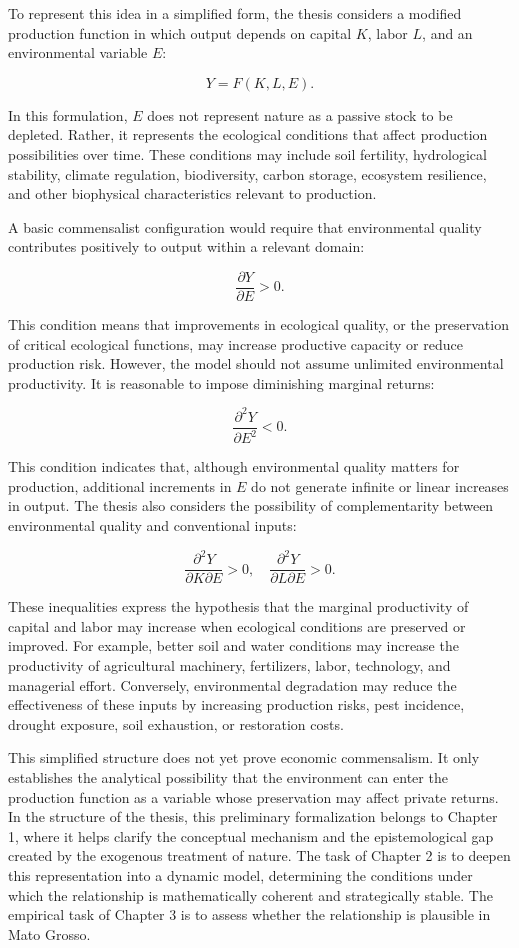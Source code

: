 To represent this idea in a simplified form, the thesis considers a modified production function in which output depends on capital \(K\), labor \(L\), and an environmental variable \(E\):

\[
Y = F(K,L,E).
\]

In this formulation, \(E\) does not represent nature as a passive stock to be depleted. Rather, it represents the ecological conditions that affect production possibilities over time. These conditions may include soil fertility, hydrological stability, climate regulation, biodiversity, carbon storage, ecosystem resilience, and other biophysical characteristics relevant to production.

A basic commensalist configuration would require that environmental quality contributes positively to output within a relevant domain:

\[
\frac{\partial Y}{\partial E} > 0.
\]

This condition means that improvements in ecological quality, or the preservation of critical ecological functions, may increase productive capacity or reduce production risk. However, the model should not assume unlimited environmental productivity. It is reasonable to impose diminishing marginal returns:

\[
\frac{\partial^2 Y}{\partial E^2} < 0.
\]

This condition indicates that, although environmental quality matters for production, additional increments in \(E\) do not generate infinite or linear increases in output. The thesis also considers the possibility of complementarity between environmental quality and conventional inputs:

\[
\frac{\partial^2 Y}{\partial K \partial E} > 0,
\quad
\frac{\partial^2 Y}{\partial L \partial E} > 0.
\]

These inequalities express the hypothesis that the marginal productivity of capital and labor may increase when ecological conditions are preserved or improved. For example, better soil and water conditions may increase the productivity of agricultural machinery, fertilizers, labor, technology, and managerial effort. Conversely, environmental degradation may reduce the effectiveness of these inputs by increasing production risks, pest incidence, drought exposure, soil exhaustion, or restoration costs.

This simplified structure does not yet prove economic commensalism. It only establishes the analytical possibility that the environment can enter the production function as a variable whose preservation may affect private returns. In the structure of the thesis, this preliminary formalization belongs to Chapter 1, where it helps clarify the conceptual mechanism and the epistemological gap created by the exogenous treatment of nature. The task of Chapter 2 is to deepen this representation into a dynamic model, determining the conditions under which the relationship is mathematically coherent and strategically stable. The empirical task of Chapter 3 is to assess whether the relationship is plausible in Mato Grosso.

